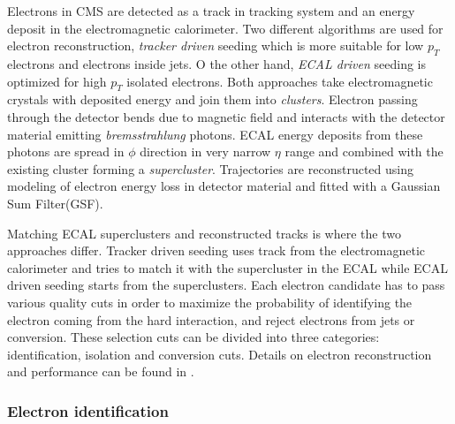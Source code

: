 Electrons in CMS are detected as a track in tracking system and an energy deposit in the electromagnetic calorimeter. Two different algorithms are used for electron reconstruction, \textit{tracker driven} seeding which is more suitable for low $p_T$ electrons and electrons inside jets. O the other hand, \textit{ECAL driven} seeding is optimized for high $p_T$ isolated electrons. Both approaches take electromagnetic crystals with deposited energy and join them into \textit{clusters}. Electron passing through the detector bends due to magnetic field and interacts with the detector material emitting \textit{bremsstrahlung} photons. ECAL energy deposits from these photons are spread in $\phi$ direction in very narrow $\eta$ range and combined with the existing cluster forming a \textit{supercluster}. Trajectories are reconstructed using modeling of electron energy loss in detector material and fitted with a Gaussian Sum Filter(GSF)\cite{2005JPhG31N9A}.
\par Matching ECAL superclusters and reconstructed tracks is where the two approaches differ. Tracker driven seeding uses track from the electromagnetic calorimeter and tries to match it with the supercluster in the ECAL while ECAL driven seeding starts from the superclusters.
Each electron candidate has to pass various quality cuts in order to maximize the probability of identifying the electron coming from the hard interaction, and reject electrons from jets or conversion. These selection cuts can be divided into three categories: identification, isolation and conversion cuts. Details on electron reconstruction and performance can be found in \cite{CMS:2010bta}.

\subsubsection*{Electron identification}
\label{sec:eleID}

